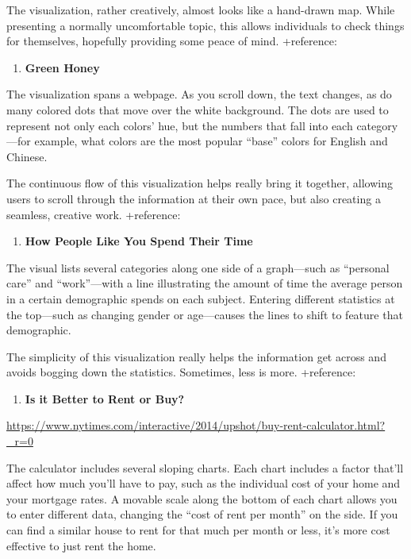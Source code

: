 \documentclass[]{book}
\providecommand{\tightlist}{%
  \setlength{\itemsep}{0pt}\setlength{\parskip}{0pt}}
\theoremstyle{definition}
\theoremstyle{definition}
\theoremstyle{definition}
\theoremstyle{remark}
\begin{document}
The visualization, rather creatively, almost looks like a hand-drawn
map. While presenting a normally uncomfortable topic, this allows
individuals to check things for themselves, hopefully providing some
peace of mind. +reference: \citep{spies_sky}

\begin{enumerate}
\def\labelenumi{\arabic{enumi}.}
\setcounter{enumi}{2}
\tightlist
\item
  \textbf{Green Honey}
\end{enumerate}

The visualization spans a webpage. As you scroll down, the text changes,
as do many colored dots that move over the white background. The dots
are used to represent not only each colors' hue, but the numbers that
fall into each category---for example, what colors are the most popular
``base'' colors for English and Chinese.

The continuous flow of this visualization helps really bring it
together, allowing users to scroll through the information at their own
pace, but also creating a seamless, creative work. +reference:
\citep{green_honey}

\begin{enumerate}
\def\labelenumi{\arabic{enumi}.}
\setcounter{enumi}{3}
\tightlist
\item
  \textbf{How People Like You Spend Their Time}
\end{enumerate}

The visual lists several categories along one side of a graph---such as
``personal care'' and ``work''---with a line illustrating the amount of
time the average person in a certain demographic spends on each subject.
Entering different statistics at the top---such as changing gender or
age---causes the lines to shift to feature that demographic.

The simplicity of this visualization really helps the information get
across and avoids bogging down the statistics. Sometimes, less is more.
+reference: \citep{spendingtime}

\begin{enumerate}
\def\labelenumi{\arabic{enumi}.}
\setcounter{enumi}{4}
\tightlist
\item
  \textbf{Is it Better to Rent or Buy?}
\end{enumerate}

\url{https://www.nytimes.com/interactive/2014/upshot/buy-rent-calculator.html?_r=0}

The calculator includes several sloping charts. Each chart includes a
factor that'll affect how much you'll have to pay, such as the
individual cost of your home and your mortgage rates. A movable scale
along the bottom of each chart allows you to enter different data,
changing the ``cost of rent per month'' on the side. If you can find a
similar house to rent for that much per month or less, it's more cost
effective to just rent the home.
\end{document}
